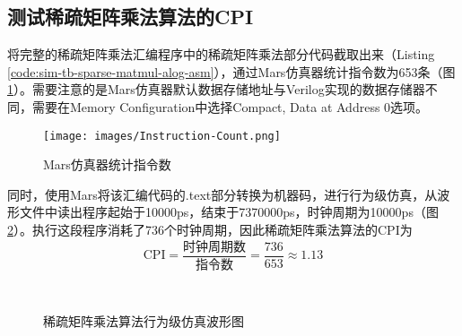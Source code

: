 \subsection{测试稀疏矩阵乘法算法的CPI}
将完整的稀疏矩阵乘法汇编程序中的稀疏矩阵乘法部分代码截取出来（Listing \ref{code:sim-tb-sparse-matmul-alog-asm}），通过Mars仿真器统计指令数为653条（图 \ref{fig:instruction-count}）。需要注意的是Mars仿真器默认数据存储地址与Verilog实现的数据存储器不同，需要在Memory Configuration中选择Compact, Data at Address 0选项。

\begin{figure}[H]
    \centering
    \texttt{[image: images/Instruction-Count.png]}
    \vspace{-2em}
    \caption{Mars仿真器统计指令数}
    \label{fig:instruction-count}
\end{figure}

同时，使用Mars将该汇编代码的.text部分转换为机器码，进行行为级仿真，从波形文件中读出程序起始于10000ps，结束于7370000ps，时钟周期为10000ps（图 \ref{fig:simulation-time}）。执行这段程序消耗了736个时钟周期，因此稀疏矩阵乘法算法的CPI为
\begin{equation}
    \text{CPI} = \frac{\text{时钟周期数}}{\text{指令数}} = \frac{736}{653} \approx 1.13
\end{equation}

\begin{figure}[H]
    \centering
    \\
    \vspace{-1em}
    \caption{稀疏矩阵乘法算法行为级仿真波形图}
    \label{fig:simulation-time}
\end{figure}
